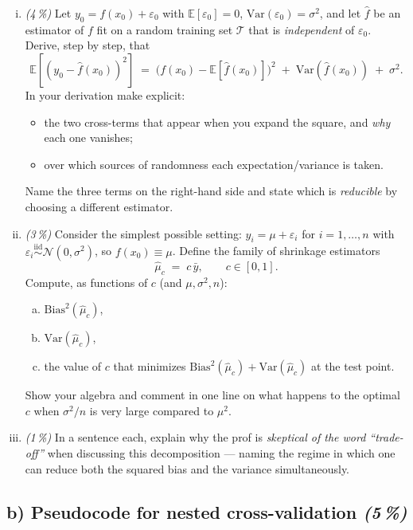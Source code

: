 \documentclass[11pt,a4paper]{article}
\newcommand{\subpoints}[1]{\textit{(#1\,\%)}}
\begin{document}
\begin{enumerate}[(i)]
  \item \subpoints{4} Let $y_0 = f(x_0)+\varepsilon_0$ with $\mathbb{E}[\varepsilon_0]=0$, $\mathrm{Var}(\varepsilon_0)=\sigma^2$, and let $\hat f$ be an estimator of $f$ fit on a random training set $\mathcal{T}$ that is \emph{independent} of $\varepsilon_0$. Derive, step by step, that
  $$\mathbb{E}\!\left[(y_0-\hat f(x_0))^2\right]
   \;=\; \bigl(f(x_0)-\mathbb{E}[\hat f(x_0)]\bigr)^2
   \;+\; \mathrm{Var}(\hat f(x_0))
   \;+\; \sigma^2.$$
  In your derivation make explicit:
  \begin{itemize}
    \item the two cross-terms that appear when you expand the square, and \emph{why} each one vanishes;
    \item over which sources of randomness each expectation/variance is taken.
  \end{itemize}
  Name the three terms on the right-hand side and state which is \emph{reducible} by choosing a different estimator.
  \item \subpoints{3} Consider the simplest possible setting: $y_i = \mu + \varepsilon_i$ for $i=1,\dots,n$ with $\varepsilon_i\overset{\mathrm{iid}}{\sim}\mathcal{N}(0,\sigma^2)$, so $f(x_0)\equiv \mu$. Define the family of shrinkage estimators
  $$\hat\mu_c \;=\; c\,\bar y, \qquad c\in[0,1].$$
  Compute, as functions of $c$ (and $\mu,\sigma^2,n$):
  \begin{enumerate}[(a)]
    \item $\mathrm{Bias}^2(\hat\mu_c)$,
    \item $\mathrm{Var}(\hat\mu_c)$,
    \item the value of $c$ that minimizes $\mathrm{Bias}^2(\hat\mu_c)+\mathrm{Var}(\hat\mu_c)$ at the test point.
  \end{enumerate}
  Show your algebra and comment in one line on what happens to the optimal $c$ when $\sigma^2/n$ is very large compared to $\mu^2$.
  \item \subpoints{1} In a sentence each, explain why the prof is \emph{skeptical of the word ``trade-off''} when discussing this decomposition --- naming the regime in which one can reduce both the squared bias and the variance simultaneously.
\end{enumerate}

\subsection*{b) Pseudocode for nested cross-validation \subpoints{5}}
\end{document}
